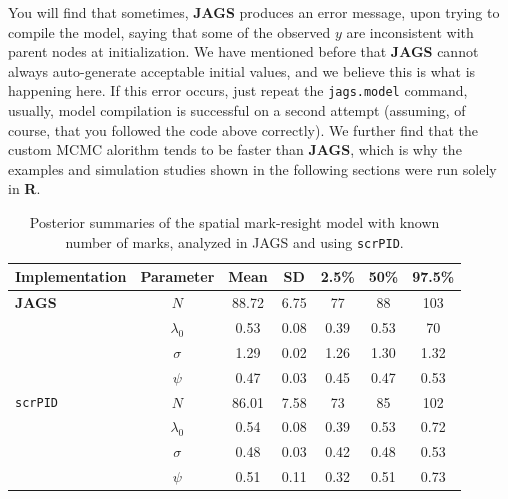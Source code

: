 You will find that sometimes, {\bf JAGS} produces an error message, upon trying to compile the model, saying that some of the observed $y$ are inconsistent with parent nodes at initialization. We have mentioned before that  {\bf JAGS} cannot always auto-generate acceptable %
initial values, and we believe this is what is happening here. If this error occurs, just repeat the {\tt jags.model} command, usually, model compilation is successful on a second attempt (assuming, of course, that you followed the code above correctly). We further find that the custom MCMC alorithm tends to be faster than {\bf JAGS}, which is why the examples and simulation studies shown in the following sections were run solely in {\bf R}.

\begin{table}
\label{partialID.tab.knownm}
\centering
  \caption{Posterior summaries of the spatial mark-resight model with known number of marks, analyzed in JAGS and using {\tt scrPID}.}
  \begin{tabular}{lcccccc}
             \hline
  Implementation & Parameter   & Mean  & SD   & 2.5\% & 50\% & 97.5\% \\
           \hline
{\bf JAGS}       & $N$         & 88.72 & 6.75 & 77    & 88   & 103    \\
		 & $\lambda_0$ & 0.53  & 0.08 & 0.39  & 0.53 & 70     \\
		 & $\sigma$    & 1.29  & 0.02 & 1.26  & 1.30 & 1.32   \\
		 & $\psi$      & 0.47  & 0.03 & 0.45  & 0.47 & 0.53   \\
		\hline
{\tt scrPID}     & $N$         & 86.01 & 7.58 & 73    & 85   & 102    \\
		 & $\lambda_0$ & 0.54  & 0.08 & 0.39  & 0.53 & 0.72   \\
		 & $\sigma$    & 0.48  & 0.03 & 0.42  & 0.48 & 0.53   \\
		 & $\psi$      & 0.51  & 0.11 & 0.32  & 0.51 & 0.73   \\
			\hline
  \end{tabular}
\end{table}


